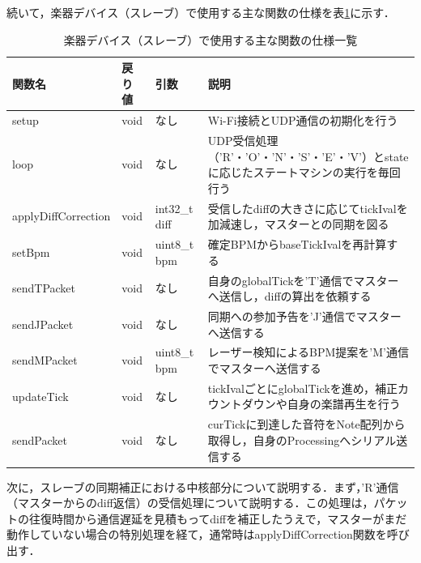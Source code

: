 続いて，楽器デバイス（スレーブ）で使用する主な関数の仕様を表\ref{table:douki_slave_func}に示す．

\begin{table}[H]
    \caption{楽器デバイス（スレーブ）で使用する主な関数の仕様一覧}
    \centering
    \label{table:douki_slave_func}
    \begin{tabular}{p{4.2cm}p{1.5cm}p{2.8cm}p{4.5cm}}
    \hline
    \textbf{関数名} & \textbf{戻り値} & \textbf{引数} & \textbf{説明}\\
    \hline
    setup & void & なし & Wi-Fi接続とUDP通信の初期化を行う\\
    \hline
    loop & void & なし & UDP受信処理（'R'・'O'・'N'・'S'・'E'・'V'）とstateに応じたステートマシンの実行を毎回行う\\
    \hline
    applyDiffCorrection & void & int32\_t diff & 受信したdiffの大きさに応じてtickIvalを加減速し，マスターとの同期を図る\\
    \hline
    setBpm & void & uint8\_t bpm & 確定BPMからbaseTickIvalを再計算する\\
    \hline
    sendTPacket & void & なし & 自身のglobalTickを'T'通信でマスターへ送信し，diffの算出を依頼する\\
    \hline
    sendJPacket & void & なし & 同期への参加予告を'J'通信でマスターへ送信する\\
    \hline
    sendMPacket & void & uint8\_t bpm & レーザー検知によるBPM提案を'M'通信でマスターへ送信する\\
    \hline
    updateTick & void & なし & tickIvalごとにglobalTickを進め，補正カウントダウンや自身の楽譜再生を行う\\
    \hline
    sendPacket & void & なし & curTickに到達した音符をNote配列から取得し，自身のProcessingへシリアル送信する\\
    \hline
    \end{tabular}
\end{table}

\fi

\iffalse
次に，スレーブの同期補正における中核部分について説明する．まず，'R'通信（マスターからのdiff返信）の受信処理について説明する．この処理は，パケットの往復時間から通信遅延を見積もってdiffを補正したうえで，マスターがまだ動作していない場合の特別処理を経て，通常時はapplyDiffCorrection関数を呼び出す．

